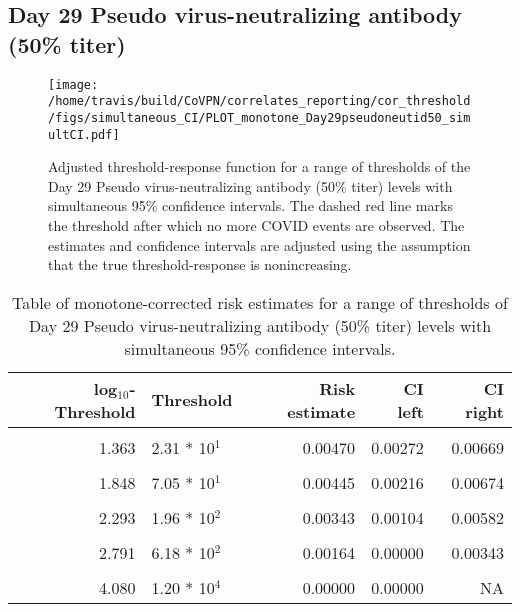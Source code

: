 \documentclass[]{book}
\theoremstyle{definition}
\theoremstyle{definition}
\theoremstyle{definition}
\newcommand{\1}{\mathbbm{1}}
\begin{document}
\newpage

\newpage

\newpage

\hypertarget{day-29-pseudo-virus-neutralizing-antibody-50-titer-3}{%
\subsection{Day 29 Pseudo virus-neutralizing antibody (50\% titer)}\label{day-29-pseudo-virus-neutralizing-antibody-50-titer-3}}

\begin{figure}[H]
\centering
\texttt{[image: /home/travis/build/CoVPN/correlates\_reporting/cor\_threshold/figs/simultaneous\_CI/PLOT\_monotone\_Day29pseudoneutid50\_simultCI.pdf]}
\caption{Adjusted threshold-response function for a range of thresholds of the
  Day 29 Pseudo virus-neutralizing antibody (50\% titer) levels with simultaneous 95\% confidence intervals. The dashed red line marks the threshold after which no more COVID events are observed. The estimates and confidence intervals are adjusted using the assumption that the true threshold-response is nonincreasing.}
\end{figure}
\begin{table}[!h]

\caption{\label{tab:unnamed-chunk-407}Table of monotone-corrected risk estimates for a range of thresholds of Day 29 Pseudo virus-neutralizing antibody (50\% titer) levels with simultaneous 95\% confidence intervals.}
\centering
\begin{tabular}[t]{rlrrr}
\toprule
log$_{10}$-Threshold & Threshold & Risk estimate & CI left & CI right\\
\midrule
\cellcolor{gray!6}{0.699} & \cellcolor{gray!6}{5.00 * 10$^0$} & \cellcolor{gray!6}{0.00585} & \cellcolor{gray!6}{0.00382} & \cellcolor{gray!6}{0.00788}\\
1.363 & 2.31 * 10$^1$ & 0.00470 & 0.00272 & 0.00669\\
\cellcolor{gray!6}{1.628} & \cellcolor{gray!6}{4.25 * 10$^1$} & \cellcolor{gray!6}{0.00468} & \cellcolor{gray!6}{0.00254} & \cellcolor{gray!6}{0.00683}\\
1.848 & 7.05 * 10$^1$ & 0.00445 & 0.00216 & 0.00674\\
\cellcolor{gray!6}{2.078} & \cellcolor{gray!6}{1.20 * 10$^2$} & \cellcolor{gray!6}{0.00411} & \cellcolor{gray!6}{0.00180} & \cellcolor{gray!6}{0.00642}\\
2.293 & 1.96 * 10$^2$ & 0.00343 & 0.00104 & 0.00582\\
\cellcolor{gray!6}{2.537} & \cellcolor{gray!6}{3.44 * 10$^2$} & \cellcolor{gray!6}{0.00164} & \cellcolor{gray!6}{0.00000} & \cellcolor{gray!6}{0.00345}\\
2.791 & 6.18 * 10$^2$ & 0.00164 & 0.00000 & 0.00343\\
\cellcolor{gray!6}{3.109} & \cellcolor{gray!6}{1.29 * 10$^3$} & \cellcolor{gray!6}{0.00164} & \cellcolor{gray!6}{0.00000} & \cellcolor{gray!6}{0.00565}\\
4.080 & 1.20 * 10$^4$ & 0.00000 & 0.00000 & NA\\
\bottomrule
\end{tabular}
\end{table}
\end{document}
